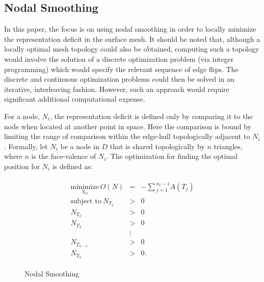 
\subsection{Nodal Smoothing}
In this paper, the focus is on using nodal smoothing in 
order to locally minimize the representation deficit in the surface mesh.  
It should be noted that, although a locally optimal mesh topology could 
also be obtained, computing such a topology would involve the solution of 
a discrete optimization problem (via integer programming) which would 
specify the relevant sequence of edge flips.  The discrete 
and continuous optimization problems could then be solved in an iterative, 
interleaving fashion.  However, such an approach would require significant 
additional computational expense.

For a node, $N_i$, the representation deficit is defined only by
comparing it to the node when located at another point in space. Here
the comparison is bound by limiting the range of comparison within the
edge-hull topologically adjacent to $N_i$. Formally, let $N_i$ be a node
in $D$ that is shared topologically by $n$ triangles, where $n$ is the
face-valence of $N_i$. The optimization for finding the optimal position
for $N_i$ is defined as:

\begin{eqnarray*}
\begin{array}{rcl}
\underset{N_O}{\text{minimize}} \ O(N) & = &
-\sum{_{j=1}^{n_t-1}A\left(T_j\right)} \\
\text{subject to} \ N_{T_1} & > & 0 \\
N_{T_2} & > & 0 \\ 
N_{T_3} & > & 0 \\
& \vdots & \\
N_{T_{n-1}} & > & 0 \\ 
N_{T_n} & > & 0.
\end{array}
\end{eqnarray*}

\begin{figure}[h!]
  \caption{Nodal Smoothing}
\end{figure}

